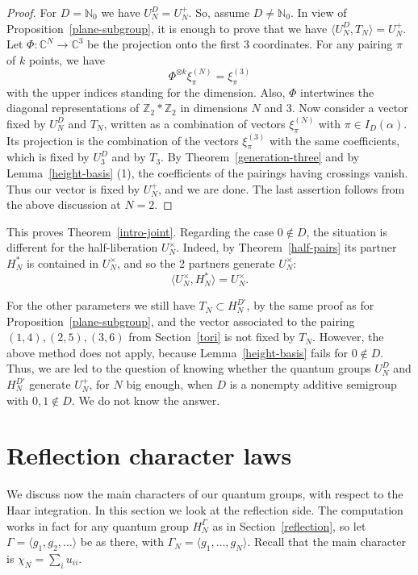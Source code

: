 \documentclass[11pt,a4paper]{article}
\begin{document}
\begin{proof}
For $D=\mathbb N_0$ we have $U_N^D=U_N^+$. So, assume $D\neq\mathbb N_0$. In view of Proposition~\ref{plane-subgroup}, it is enough to prove that we have $\langle U_N^D,T_N\rangle=U_N^+$. Let $\Phi:\mathbb C^N\to\mathbb C^3$ be the projection onto the first 3 coordinates. For any pairing $\pi$ of $k$ points, we have
\[
 \Phi^{\otimes k}\xi_\pi^{(N)}=\xi_\pi^{(3)}
\]
with the upper indices standing for the dimension. Also, $\Phi$ intertwines the diagonal representations of $\mathbb Z_2*\mathbb Z_2$ in dimensions $N$ and $3$. Now consider a vector fixed by $U_N^D$ and $T_N$, written as a combination of vectors $\xi_\pi^{(N)}$ with $\pi\in I_D(\alpha)$. Its projection is the combination of the vectors $\xi_\pi^{(3)}$ with the same coefficients, which is fixed by $U_3^D$ and by $T_3$. By Theorem~\ref{generation-three} and by Lemma~\ref{height-basis} (1), the coefficients of the pairings having crossings vanish. Thus our vector is fixed by $U_N^+$, and we are done. The last assertion follows from the above discussion at $N=2$.
\end{proof}

This proves Theorem~\ref{intro-joint}. Regarding the case $0\notin D$, the situation is different for the half-liberation $U_N^\times$. Indeed, by Theorem~\ref{half-pairs} its partner $H_N^*$ is contained in $U_N^\times$, and so the 2 partners generate $U_N^\times$:
\[
 \big\langle U_N^\times,H_N^*\big\rangle=U_N^\times.
\]

For the other parameters we still have $T_N\subset H_N^{D'}$, by the same proof as for Proposition~\ref{plane-subgroup}, and the vector associated to the pairing $(1,4),(2,5),(3,6)$ from Section~\ref{tori} is not fixed by $T_N$. However, the above method does not apply, because Lemma~\ref{height-basis} fails for $0\notin D$. Thus, we are led to the question of knowing whether the quantum groups $U_N^D$ and $H_N^{D'}$ generate $U_N^+$, for $N$ big enough, when $D$ is a nonempty additive semigroup with $0,1\notin D$. We do not know the answer.

\section{Reflection character laws}\label{reflection-laws}

We discuss now the main characters of our quantum groups, with respect to the Haar integration. In this section we look at the reflection side. The computation works in fact for any quantum group $H_N^\Gamma$ as in Section~\ref{reflection}, so let $\Gamma=\langle g_1,g_2,\ldots\rangle$ be as there, with $\Gamma_N=\langle g_1,\ldots,g_N\rangle$. Recall that the main character is $\chi_N=\sum_iu_{ii}$.
\end{document}
